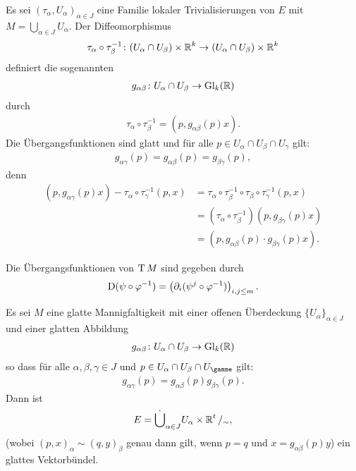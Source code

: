 Es sei $(\tau_\alpha,U_{\alpha})_{\alpha \in J}$ eine Familie lokaler Trivialisierungen von $E$ mit $M = \bigcup_{\alpha \in J}U_{\alpha}$.
Der Diffeomorphismus
\begin{align*}
  \tau_{\alpha} \circ \tau_{\beta}^{-1}\colon (U_{\alpha} \cap U_{\beta}) \times \operatorname{\mathbb{R}}^k \to (U_{\alpha} \cap U_{\beta}) \times \operatorname{\mathbb{R}}^k
\end{align*}
definiert die sogenannten 
\begin{align*}
  g_{\alpha\beta} \colon U_{\alpha} \cap U_{\beta} \to \operatorname{Gl}_k(\operatorname{\mathbb{R}})
\end{align*}
durch 
\begin{align*}
  \tau_{\alpha} \circ \tau_{\beta}^{-1} = (p,g_{\alpha\beta}(p) x).
\end{align*}
Die Übergangsfunktionen sind glatt und für alle $p \in U_{\alpha} \cap U_{\beta} \cap U_{\gamma}$ gilt:
\begin{align*}
  g_{\alpha\gamma}(p) = g_{\alpha\beta}(p) = g_{\beta\gamma}(p),
\end{align*}
denn
\begin{align*}
  (p,g_{\alpha\gamma}(p)x) - \tau_{\alpha} \circ \tau_{\gamma}^{-1}(p,x) & = \tau_{\alpha} \circ \tau_{\beta}^{-1} \circ \tau_{\beta} \circ \tau_{\gamma}^{-1}(p,x)\\
& = (\tau_{\alpha} \circ \tau_{\beta}^{-1})(p,g_{\beta\gamma}(p)x)\\
& = (p,g_{\alpha\beta}(p)\cdot g_{\beta\gamma}(p)x).
\end{align*}

\begin{bsp}
  Die Übergangsfunktionen von $\operatorname{T} M$ sind gegeben durch
  \begin{align*}
    \operatorname{D}(\psi \circ \varphi^{-1}) = \left(\partial_i(\psi^j \circ \varphi^{-1})\right)_{i,j \leq m}.
  \end{align*}
\end{bsp}

\begin{Satz}
  Es sei $M$ eine glatte Mannigfaltigkeit mit einer offenen Überdeckung $\{U_{\alpha}\}_{\alpha \in J}$ und einer glatten Abbildung
  \begin{align*}
    g_{\alpha\beta} \colon U_{\alpha} \cap U_{\beta} \to \operatorname{Gl}_k(\operatorname{\mathbb{R}})
  \end{align*}
so dass für alle $\alpha,\beta,\gamma \in J$ und $p \in U_{\alpha} \cap U_{\beta} \cap U_{\gamme}$ gilt:
\begin{align*}
  g_{\alpha\gamma} (p) = g_{\alpha\beta}(p)g_{\beta\gamma}(p).
\end{align*}
Dann ist
\begin{align*}
  E = \dot\bigcup_{\alpha \in J} U_{\alpha} \times \operatorname{\mathbb{R}}^t/_{\sim},
\end{align*}
(wobei $(p,x)_{\alpha} \sim (q,y)_{\beta}$ genau dann gilt, wenn $p = q$ und $x = g_{\alpha\beta}(p)y$) ein glattes Vektorbündel.
\end{Satz}

